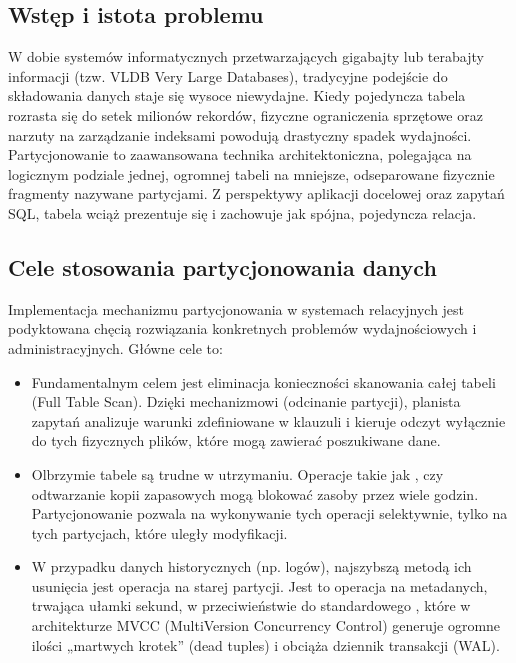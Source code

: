 \documentclass[letterpaper,10pt,polish]{sphinxmanual}
\begin{document}
\subsection{Wstęp i istota problemu}
\label{\detokenize{rozdzia_u0142_2/rozdzia_u0142_26/index:wstep-i-istota-problemu}}
\sphinxAtStartPar
W dobie systemów informatycznych przetwarzających gigabajty lub terabajty informacji (tzw. VLDB \sphinxhyphen{} Very Large Databases), tradycyjne podejście do składowania danych staje się wysoce niewydajne. Kiedy pojedyncza tabela rozrasta się do setek milionów rekordów, fizyczne ograniczenia sprzętowe oraz narzuty na zarządzanie indeksami powodują drastyczny spadek wydajności. Partycjonowanie to zaawansowana technika architektoniczna, polegająca na logicznym podziale jednej, ogromnej tabeli na mniejsze, odseparowane fizycznie fragmenty nazywane partycjami. Z perspektywy aplikacji docelowej oraz zapytań SQL, tabela wciąż prezentuje się i zachowuje jak spójna, pojedyncza relacja.


\subsection{Cele stosowania partycjonowania danych}
\label{\detokenize{rozdzia_u0142_2/rozdzia_u0142_26/index:cele-stosowania-partycjonowania-danych}}
\sphinxAtStartPar
Implementacja mechanizmu partycjonowania w systemach relacyjnych jest podyktowana chęcią rozwiązania konkretnych problemów wydajnościowych i administracyjnych. Główne cele to:
\begin{itemize}
\item {} 
\sphinxAtStartPar
{} Fundamentalnym celem jest eliminacja konieczności skanowania całej tabeli (Full Table Scan). Dzięki mechanizmowi  (odcinanie partycji), planista zapytań analizuje warunki zdefiniowane w klauzuli  i kieruje odczyt wyłącznie do tych fizycznych plików, które mogą zawierać poszukiwane dane.

\item {} 
\sphinxAtStartPar
{} Olbrzymie tabele są trudne w utrzymaniu. Operacje takie jak ,  czy odtwarzanie kopii zapasowych mogą blokować zasoby przez wiele godzin. Partycjonowanie pozwala na wykonywanie tych operacji selektywnie, tylko na tych partycjach, które uległy modyfikacji.

\item {} 
\sphinxAtStartPar
{} W przypadku danych historycznych (np. logów), najszybszą metodą ich usunięcia jest operacja  na starej partycji. Jest to operacja na metadanych, trwająca ułamki sekund, w przeciwieństwie do standardowego , które w architekturze MVCC (Multi\sphinxhyphen{}Version Concurrency Control) generuje ogromne ilości „martwych krotek” (dead tuples) i obciąża dziennik transakcji (WAL).

\end{itemize}
\end{document}
